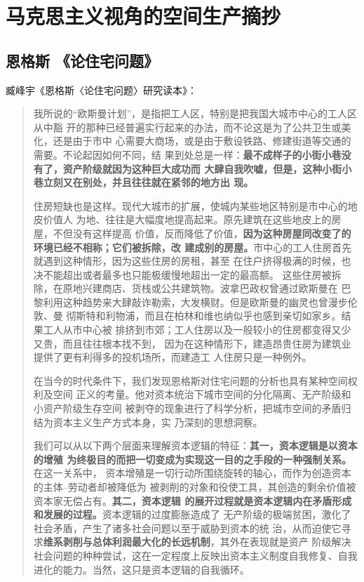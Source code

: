 \chapter{马克思主义视角的空间生产摘抄}

\section{恩格斯 《论住宅问题》}

臧峰宇《恩格斯〈论住宅问题〉研究读本》：
\begin{quotation}
  我所说的“欧斯曼计划”，是指把工人区，特别是把我国大城市中心的工人区从中豁
  开的那种已经普遍实行起来的办法，而不论这是为了公共卫生或美化，还是由于市中
  心需要大商场，或是由于敷设铁路、修建街道等交通的需要。不论起因如何不同，结
  果到处总是一样：\textbf{最不成样子的小街小巷没有了，资产阶级就因为这种巨大成功而
    大肆自我吹嘘，但是，这种小街小巷立刻又在别处，并且往往就在紧邻的地方出
    现。}\cite[243]{maenwen3}

  住房短缺也是这样。现代大城市的扩展，使城内某些地区特别是市中心的地皮价值人
  为地、往往是大幅度地提高起来。原先建筑在这些地皮上的房屋，不但没有这样提高
  价值，反而降低了价值，\textbf{因为这种房屋同改变了的环境已经不相称；它们被拆除，改
  建成别的房屋。}市中心的工人住房首先就遇到这种情形，因为这些住房的房租，甚至
  在住户挤得极满的时候，也决不能超出或者最多也只能极缓慢地超出一定的最高额。
  这些住房被拆除，在原地兴建商店、货栈或公共建筑物。波拿巴政权曾通过欧斯曼在
  巴黎利用这种趋势来大肆敲诈勒索，大发横财。但是欧斯曼的幽灵也曾漫步伦敦、曼
  彻斯特和利物浦，而且在柏林和维也纳似乎也感到亲切如家乡。结果工人从市中心被
  排挤到市郊；工人住房以及一般较小的住房都变得又少又贵，而且往往根本找不到，
  因为在这种情形下，建造昂贵住房为建筑业提供了更有利得多的投机场所，而建造工
  人住房只是一种例外。\cite[193]{maenwen3}

  在当今的时代条件下，我们发现恩格斯对住宅问题的分析也具有某种空间权利及空间
  正义的考量。他对资本统治下城市空间的分化隔离、无产阶级和小资产阶级生存空间
  被剥夺的现象进行了科学分析，把城市空间的矛盾归结为资本主义生产方式本身，实
  乃深刻的思想洞察。\cite[74]{zhuzhaiwenti}

  我们可以从以下两个层面来理解资本逻辑的特征：\textbf{其一，资本逻辑是以资本的增殖
    为终极目的而把一切变成为实现这一目的之手段的一种强制关系。}在这一关系中，
  资本增殖是一切行动所围绕旋转的轴心，而作为创造资本的主体--劳动者却被降低为
  被剥削的对象和役使工具，其创造的剩余价值被资本家无偿占有。\textbf{其二，资本逻辑
    的展开过程就是资本逻辑内在矛盾形成和发展的过程。}资本逻辑的过度膨胀造成了
  无产阶级的极端贫困，激化了社会矛盾，产生了诸多社会问题以至于威胁到资本的统
  治，从而迫使它寻求\textbf{维系剥削与总体利润最大化的长远机制}，其外在表现就是资产
  阶级解决社会问题的种种尝试，这在一定程度上反映出资本主义制度自我修复、自我
  进化的能力。当然，这只是资本逻辑的自我循环。


\end{quotation}
